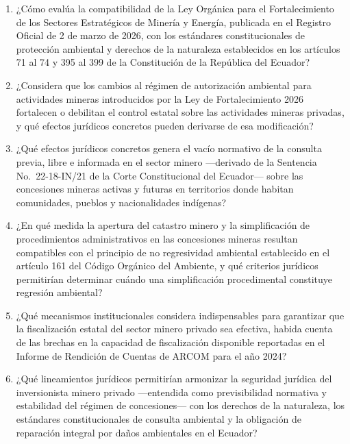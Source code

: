 \begin{enumerate}

    \item ¿Cómo evalúa la compatibilidad de la Ley Orgánica para el Fortalecimiento de los Sectores Estratégicos de Minería y Energía, publicada en el Registro Oficial de 2 de marzo de 2026, con los estándares constitucionales de protección ambiental y derechos de la naturaleza establecidos en los artículos 71 al 74 y 395 al 399 de la Constitución de la República del Ecuador?

    \item ¿Considera que los cambios al régimen de autorización ambiental para actividades mineras introducidos por la Ley de Fortalecimiento 2026 fortalecen o debilitan el control estatal sobre las actividades mineras privadas, y qué efectos jurídicos concretos pueden derivarse de esa modificación?

    \item ¿Qué efectos jurídicos concretos genera el vacío normativo de la consulta previa, libre e informada en el sector minero ---derivado de la Sentencia No.~22-18-IN/21 de la Corte Constitucional del Ecuador--- sobre las concesiones mineras activas y futuras en territorios donde habitan comunidades, pueblos y nacionalidades indígenas?

    \item ¿En qué medida la apertura del catastro minero y la simplificación de procedimientos administrativos en las concesiones mineras resultan compatibles con el principio de no regresividad ambiental establecido en el artículo 161 del Código Orgánico del Ambiente, y qué criterios jurídicos permitirían determinar cuándo una simplificación procedimental constituye regresión ambiental?

    \item ¿Qué mecanismos institucionales considera indispensables para garantizar que la fiscalización estatal del sector minero privado sea efectiva, habida cuenta de las brechas en la capacidad de fiscalización disponible reportadas en el Informe de Rendición de Cuentas de ARCOM para el año 2024?

    \item ¿Qué lineamientos jurídicos permitirían armonizar la seguridad jurídica del inversionista minero privado ---entendida como previsibilidad normativa y estabilidad del régimen de concesiones--- con los derechos de la naturaleza, los estándares constitucionales de consulta ambiental y la obligación de reparación integral por daños ambientales en el Ecuador?

\end{enumerate}
